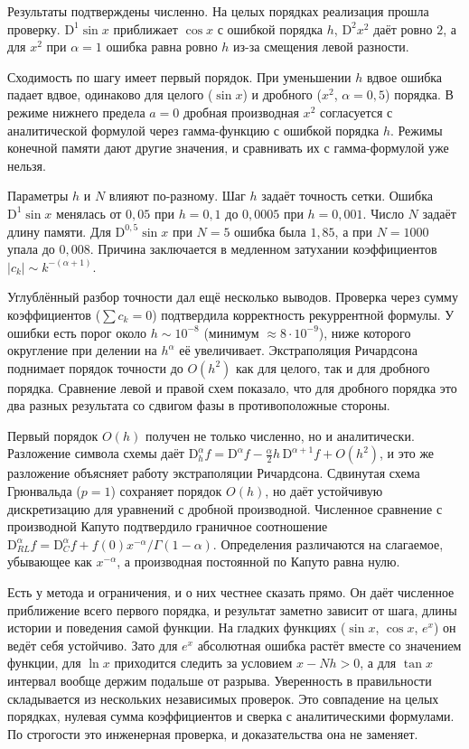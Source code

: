 \documentclass[14pt,a4paper]{extarticle}
\newcommand{\D}{\mathrm{D}}
\begin{document}
Результаты подтверждены численно. На целых порядках реализация прошла проверку. $\D^1\sin x$ приближает $\cos x$ с ошибкой порядка $h$, $\D^2 x^2$ даёт ровно $2$, а для $x^2$ при $\alpha=1$ ошибка равна ровно $h$ из-за смещения левой разности.

Сходимость по шагу имеет первый порядок. При уменьшении $h$ вдвое ошибка падает вдвое, одинаково для целого ($\sin x$) и дробного ($x^2$, $\alpha=0{,}5$) порядка. В режиме нижнего предела $a=0$ дробная производная $x^2$ согласуется с аналитической формулой через гамма-функцию с ошибкой порядка $h$. Режимы конечной памяти дают другие значения, и сравнивать их с гамма-формулой уже нельзя.

Параметры $h$ и $N$ влияют по-разному. Шаг $h$ задаёт точность сетки. Ошибка $\D^1\sin x$ менялась от $0{,}05$ при $h=0{,}1$ до $0{,}0005$ при $h=0{,}001$. Число $N$ задаёт длину памяти. Для $\D^{0{,}5}\sin x$ при $N=5$ ошибка была $1{,}85$, а при $N=1000$ упала до $0{,}008$. Причина заключается в медленном затухании коэффициентов $|c_k|\sim k^{-(\alpha+1)}$.

Углублённый разбор точности дал ещё несколько выводов. Проверка через сумму коэффициентов ($\sum c_k=0$) подтвердила корректность рекуррентной формулы. У ошибки есть порог около $h\sim10^{-8}$ (минимум $\approx8\cdot10^{-9}$), ниже которого округление при делении на $h^{\alpha}$ её увеличивает. Экстраполяция Ричардсона поднимает порядок точности до $O(h^2)$ как для целого, так и для дробного порядка. Сравнение левой и правой схем показало, что для дробного порядка это два разных результата со сдвигом фазы в противоположные стороны.

Первый порядок $O(h)$ получен не только численно, но и аналитически. Разложение символа схемы даёт $\D^{\alpha}_h f=\D^{\alpha}f-\tfrac{\alpha}{2}h\,\D^{\alpha+1}f+O(h^2)$, и это же разложение объясняет работу экстраполяции Ричардсона. Сдвинутая схема Грюнвальда ($p=1$) сохраняет порядок $O(h)$, но даёт устойчивую дискретизацию для уравнений с дробной производной. Численное сравнение с производной Капуто подтвердило граничное соотношение $\D^{\alpha}_{RL}f=\D^{\alpha}_{C}f+f(0)x^{-\alpha}/\Gamma(1-\alpha)$. Определения различаются на слагаемое, убывающее как $x^{-\alpha}$, а производная постоянной по Капуто равна нулю.

Есть у метода и ограничения, и о них честнее сказать прямо. Он даёт численное приближение всего первого порядка, и результат заметно зависит от шага, длины истории и поведения самой функции. На гладких функциях ($\sin x$, $\cos x$, $e^x$) он ведёт себя устойчиво. Зато для $e^x$ абсолютная ошибка растёт вместе со значением функции, для $\ln x$ приходится следить за условием $x-Nh>0$, а для $\tan x$ интервал вообще держим подальше от разрыва. Уверенность в правильности складывается из нескольких независимых проверок. Это совпадение на целых порядках, нулевая сумма коэффициентов и сверка с аналитическими формулами. По строгости это инженерная проверка, и доказательства она не заменяет.
\end{document}
